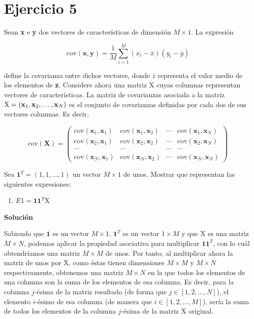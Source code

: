 \documentclass[11pt,a4paper]{article}
\newcommand{\answer}{\noindent\textbf{Solución}}
\newcommand{\cov}{\text{cov}}
\begin{document}
\section*{Ejercicio 5}

\noindent Sean \textbf{x} e \textbf{y} dos vectores de características de dimensión $M \times 1$. La expresión

\[ \cov(\mathbf{x}, \mathbf{y}) = \frac{1}{M} \sum_{i = 1}^M(x_i - \overline{x})(y_i - \overline{y})\]

\noindent define la covarianza entre dichos vectores, donde $\overline{z}$ representa el valor medio de los
elementos de \textbf{z}. Considere ahora una matriz X cuyas columnas representan vectores de características.
La matriz de covarianzas asociada a la matriz $\text{X} = (\text{\textbf{x}}_1, \text{\textbf{x}}_2, \dots ,
\text{\textbf{x}}_N)$ es el conjunto de covarianzas definidas por cada dos de sus vectores columnas. Es decir,

\begin{equation}
\label{eq:cov}
\cov(\mathbf{X})
=
\left(
{
\begin{array}{cccc}
	\cov(\mathbf{x}_1,\mathbf{x}_1) & \cov(\mathbf{x}_1,\mathbf{x}_2) & \cdots & \cov(\mathbf{x}_1,\mathbf{x}_N) \\
	\cov(\mathbf{x}_2,\mathbf{x}_1) & \cov(\mathbf{x}_2,\mathbf{x}_2) & \cdots & \cov(\mathbf{x}_2,\mathbf{x}_N) \\
	\cdots & \cdots & \cdots & \cdots \\	
	\cov(\mathbf{x}_N,\mathbf{x}_1) & \cov(\mathbf{x}_N,\mathbf{x}_2) & \cdots & \cov(\mathbf{x}_N,\mathbf{x}_N)
\end{array}
}
\right)
\end{equation}


Sea $\mathbf{1}^T = (1, 1, \dots , 1)$ un vector $M \times 1$ de unos. Mostrar que representan las siguientes expresiones:

\begin{enumerate}[label=\textit{\alph*})]
	\item $E1 = \mathbf{1}\mathbf{1}^T$X
\end{enumerate}

\answer

Sabiendo que $\mathbf{1}$ es un vector $M \times 1$, $\mathbf{1}^T$ es un vector $1 \times M$ y que X es una matriz $M \times
N$, podemos aplicar la propiedad asociativa para multiplicar $\mathbf{1}\mathbf{1}^T$, con lo cuál obtendríamos una matriz
$M \times M$ de unos. Por tanto, al multiplicar ahora la matriz de unos por X, como éstas tienen dimensiones $M \times M$ y
$M \times N$ respectivamente, obtenemos una matriz $M \times N$ en la que todos los elementos de una columna son la suma de
los elementos de esa columna. Es decir, para la columna $j$-ésima de la matriz resultado (de forma que $j \in [1, 2, \dots ,
N]$), el elemento $i$-ésimo de esa columna (de manera que $i \in [1, 2, \dots, M]$), sería la suma de todos los elementos de
la columna $j$-ésima de la matriz X original.  
\end{document}
